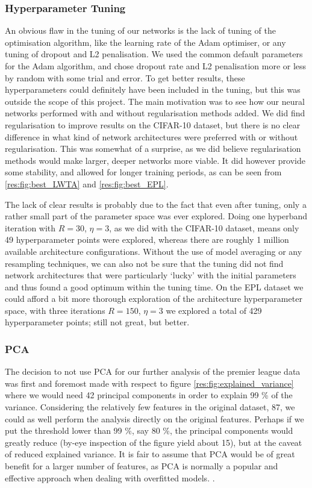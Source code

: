 \subsubsection{Hyperparameter Tuning}
    An obvious flaw in the tuning of our networks is the lack of tuning of the optimisation algorithm, like the learning rate of the Adam optimiser, or any tuning of dropout and L2 penalisation. We used the common default parameters for the Adam algorithm, and chose dropout rate and L2 penalisation more or less by random with some trial and error. To get better results, these hyperparameters could definitely have been included in the tuning, but this was outside the scope of this project. The main motivation was to see how our neural networks performed with and without regularisation methods added.
    We did find regularisation to improve results on the CIFAR-10 dataset, but there is no clear difference in what kind of network architectures were preferred with or without regularisation. This was somewhat of a surprise, as we did believe regularisation methods would make larger, deeper networks more viable. It did however provide some stability, and allowed for longer training periods, as can be seen from \cref{res:fig:best_LWTA} and \cref{res:fig:best_EPL}.

    The lack of clear results is probably due to the fact that even after tuning, only a rather small part of the parameter space was ever explored. Doing one hyperband iteration with $R=30$, $\eta=3$, as we did with the CIFAR-10 dataset, means only 49 hyperparameter points were explored, whereas there are roughly 1 million available architecture configurations. Without the use of model averaging or any resampling techniques, we can also not be sure that the tuning did not find network architectures that were particularly `lucky' with the initial parameters and thus found a good optimum within the tuning time. On the EPL dataset we could afford a bit more thorough exploration of the architecture hyperparameter space, with three iterations $R=150$, $\eta=3$ we explored a total of 429 hyperparameter points; still not great, but better.


\subsubsection{PCA}
    The decision to not use PCA for our further analysis of the premier league data was first and foremost made with respect to figure \ref{res:fig:explained_variance} where we would need 42 principal components in order to explain 99 \% of the variance. Considering the relatively few features in the original dataset, 87, we could as well perform the analysis directly on the original features. Perhaps if we put the threshold lower than 99 \%, say 80 \%, the principal components would greatly reduce (by-eye inspection of the figure yield about 15), but at the caveat of reduced explained variance. It is fair to assume that PCA would be of great benefit for a larger number of features, as PCA is normally a popular and effective approach when dealing with overfitted models. .


